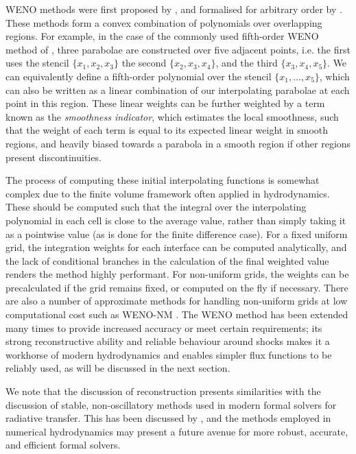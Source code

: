 WENO methods were first proposed by \citet{Liu1994}, and formalised for arbitrary order by \citet{Jiang1996}.
These methods form a convex combination of polynomials over overlapping regions.
For example, in the case of the commonly used fifth-order WENO method of \citet{Jiang1996}, three parabolae are constructed over five adjacent points, i.e. the first uses the stencil $\{x_1, x_2, x_3\}$ the second $\{x_2, x_3, x_4\}$, and the third $\{x_3, x_4, x_5\}$.
We can equivalently define a fifth-order polynomial over the stencil $\{x_1, \ldots, x_5\}$, which can also be written as a linear combination of our interpolating parabolae at each point in this region.
These linear weights can be further weighted by a term known as the \emph{smoothness indicator}, which estimates the local smoothness, such that the weight of each term is equal to its expected linear weight in smooth regions, and heavily biased towards a parabola in a smooth region if other regions present discontinuities.

The process of computing these initial interpolating functions is somewhat complex due to the finite volume framework often applied in hydrodynamics.
These should be computed such that the integral over the interpolating polynomial in each cell is close to the average value, rather than simply taking it as a pointwise value (as is done for the finite difference case).
For a fixed uniform grid, the integration weights for each interface can be computed analytically, and the lack of conditional branches in the calculation of the final weighted value renders the method highly performant.
For non-uniform grids, the weights can be precalculated if the grid remains fixed, or computed on the fly if necessary.
There are also a number of approximate methods for handling non-uniform grids at low computational cost such as WENO-NM \citep{Huang2018}.
The WENO method has been extended many times to provide increased accuracy or meet certain requirements; its strong reconstructive ability and reliable behaviour around shocks makes it a workhorse of modern hydrodynamics and enables simpler flux functions to be reliably used, as will be discussed in the next section.

We note that the discussion of reconstruction presents similarities with the discussion of stable, non-oscillatory methods used in modern formal solvers for radiative transfer.
This has been discussed by \citet{Steiner2016}, and the methods employed in numerical hydrodynamics may present a future avenue for more robust, accurate, and efficient formal solvers.

